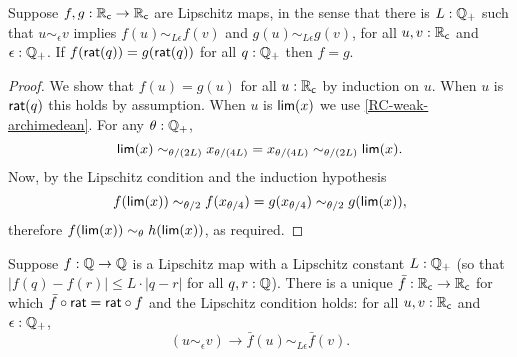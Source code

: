 \begin{lem} \label{RC-Lipschitz-eq}
  Suppose $f,g : \mathbb{R}_\mathsf{c} \to \mathbb{R}_\mathsf{c}$ are Lipschitz maps, in the sense that there is $L : \mathbb{Q}_{+}$
  such that $u \sim_\epsilon v$ implies $f(u) \sim_{L \epsilon} f(v)$ and $g(u) \sim_{L
    \epsilon} g(v)$, for all $u, v : \mathbb{R}_\mathsf{c}$ and $\epsilon : \mathbb{Q}_{+}$. If $f(\mathsf{rat}(q)) =
  g(\mathsf{rat}(q))$ for all $q : \mathbb{Q}_{+}$ then $f = g$.
\end{lem}

\begin{proof}
  We show that $f(u) = g(u)$ for all $u : \mathbb{R}_\mathsf{c}$ by induction on $u$. When $u$ is
  $\mathsf{rat}(q)$ this holds by assumption. When $u$ is $\mathsf{lim}(x)$ we use
  \autoref{RC-weak-archimedean}. For any $\theta : \mathbb{Q}_{+}$,
  \begin{equation*}
    \mathsf{lim}(x) \sim_{\theta/(2 L)}
    x_{\theta/(4 L)} =
    x_{\theta/(4 L)} \sim_{\theta/(2 L)}
    \mathsf{lim}(x).
  \end{equation*}
  Now, by the Lipschitz condition and the induction hypothesis
  \begin{equation*}
    f(\mathsf{lim}(x)) \sim_{\theta/2}
    f(x_{\theta/4}) =
    g(x_{\theta/4}) \sim_{\theta/2}
    g(\mathsf{lim}(x)),
  \end{equation*}
  therefore $f(\mathsf{lim}(x)) \sim_\theta h(\mathsf{lim}(x))$, as required.
\end{proof}

\begin{lem}\label{RC-extend-Q-Lipschitz}
  Suppose $f : \mathbb{Q} \to \mathbb{Q}$ is a Lipschitz map with a Lipschitz constant $L : \mathbb{Q}_{+}$ (so that
  $|f(q) - f(r)| \leq L \cdot |q - r|$ for all $q, r : \mathbb{Q}$). There is a unique $\bar{f} :
  \mathbb{R}_\mathsf{c} \to \mathbb{R}_\mathsf{c}$ for which $\bar{f} \circ \mathsf{rat} = \mathsf{rat} \circ f$ and the Lipschitz
  condition holds: for all $u, v : \mathbb{R}_\mathsf{c}$ and $\epsilon : \mathbb{Q}_{+}$,
  \begin{equation*}
    (u \sim_\epsilon v) \to \bar{f}(u) \sim_{L \epsilon} \bar{f}(v).
  \end{equation*}
\end{lem}

